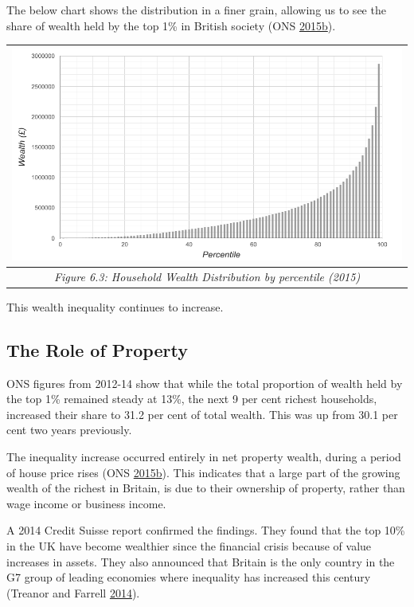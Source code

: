\documentclass[]{tufte-handout}
\begin{document}
The below chart shows the distribution in a finer grain, allowing us to
see the share of wealth held by the top 1\% in British society (ONS
\protect\hyperlink{ref-ONSWELLBEING2015}{2015}\protect\hyperlink{ref-ONSWELLBEING2015}{b}).

\begin{longtable}[]{@{}c@{}}
\toprule
\includegraphics{ChapterPictures/6-3-HouseholdWealthDistribution.png}\tabularnewline
\midrule
\endhead
\emph{Figure 6.3: Household Wealth Distribution by percentile
(2015)}\tabularnewline
\bottomrule
\end{longtable}

This wealth inequality continues to increase.

\hypertarget{the-role-of-property}{%
\subsection{The Role of Property}\label{the-role-of-property}}

ONS figures from 2012-14 show that while the total proportion of wealth
held by the top 1\% remained steady at 13\%, the next 9 per cent richest
households, increased their share to 31.2 per cent of total wealth. This
was up from 30.1 per cent two years previously.

The inequality increase occurred entirely in net property wealth, during
a period of house price rises (ONS
\protect\hyperlink{ref-ONSWELLBEING2015}{2015}\protect\hyperlink{ref-ONSWELLBEING2015}{b}).
This indicates that a large part of the growing wealth of the richest in
Britain, is due to their ownership of property, rather than wage income
or business income.

A 2014 Credit Suisse report confirmed the findings. They found that the
top 10\% in the UK have become wealthier since the financial crisis
because of value increases in assets. They also announced that Britain
is the only country in the G7 group of leading economies where
inequality has increased this century (Treanor and Farrell
\protect\hyperlink{ref-TreanorFarrell2014}{2014}).
\end{document}
